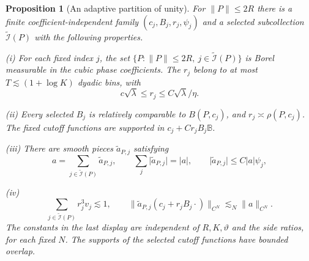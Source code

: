 \documentclass[11pt]{amsart}
\newtheorem{proposition}[theorem]{Proposition}
\theoremstyle{definition}
\theoremstyle{remark}
\newcommand{\norm}[1]{\lVert #1\rVert}
\newcommand{\abs}[1]{\lvert #1\rvert}
\numberwithin{equation}{section}
\begin{document}
\begin{proposition}[An adaptive partition of unity]\label{low:3:prop:resolution}
For $\norm P\leq2R$ there is a finite coefficient-independent family $(c_j,B_j,r_j,\psi_j)$ and a selected subcollection $\widetilde{\mathcal I}(P)$ with the following properties.

\noindent\textup{(i)} For each fixed index $j$, the set $\{P:\|P\|\le2R,\ j\in\widetilde{\mathcal I}(P)\}$ is Borel measurable in the cubic phase coefficients. The $r_j$ belong to at most $T\lesssim (1+\log K)$ dyadic bins, with
\[
c\sqrt\lambda\leq r_j\leq C\sqrt\lambda/\eta.
\]

\noindent\textup{(ii)} Every selected $B_j$ is relatively comparable to $B(P,c_j)$, and $r_j\asymp\rho(P,c_j)$. The fixed cutoff functions are supported in $c_j+C r_jB_j\mathbb B$.

\noindent\textup{(iii)} There are smooth pieces $\widetilde a_{P,j}$ satisfying
\begin{equation}\label{low:3:eq:positive-resolution}
a=\sum_{j\in\widetilde{\mathcal I}(P)}\widetilde a_{P,j},\qquad
\sum_j\abs{\widetilde a_{P,j}}=\abs a,\qquad
\abs{\widetilde a_{P,j}}\leq C\abs a\psi_j,
\end{equation}

\noindent\textup{(iv)} \begin{equation}\label{low:3:eq:adaptive-mass} \sum_{j\in\widetilde{\mathcal I}(P)}r_j^3v_j\lesssim 1,\qquad \norm{\widetilde a_{P,j}(c_j+r_jB_j\cdot)}_{C^N}\lesssim_N \norm a_{C^N}. \end{equation} The constants in the last display are independent of $R,K,\vartheta$ and the side ratios, for each fixed $N$. The supports of the selected cutoff functions have bounded overlap.
\end{proposition}
\end{document}
